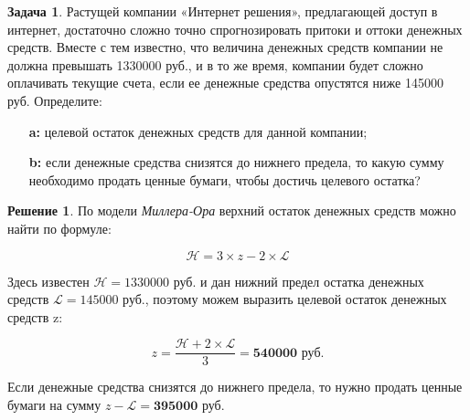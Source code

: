 \documentclass[a4paper, 14pt]{article}
\theoremstyle{plain} %
\theoremstyle{definition} %
\newtheorem*{solution}{Решение}
\newtheorem{problem}{Задача}[subsection]
\theoremstyle{remark} %
\begin{document}
\begin{problem}
	Растущей компании «Интернет решения», предлагающей доступ в интернет, достаточно сложно точно спрогнозировать притоки и оттоки денежных средств. Вместе с тем известно, что  величина денежных средств компании не должна превышать 1330000 руб., и в то же время, компании будет сложно оплачивать текущие счета, если ее денежные средства опустятся ниже 145000 руб. Определите:
	\begin{itemize}
		\item[\textbf{a:}] целевой  остаток  денежных  средств  для  данной компании;
		\item[\textbf{b:}] если  денежные  средства  снизятся  до  нижнего предела,  то  какую  сумму  необходимо  продать  ценные  бумаги,  чтобы  достичь целевого остатка?
	\end{itemize}
	\begin{solution}
		По  модели  \emph{Миллера-Ора}  верхний остаток денежных средств можно найти по формуле:

		\[
			\mathcal{H} = 3\times z - 2 \times \mathcal{L}
		\]

		Здесь  известен  $\mathcal{H} = 1330000$  руб.  и  дан  нижний  предел  остатка  денежных средств  $\mathcal{L} = 145000$  руб.,  поэтому  можем  выразить  целевой  остаток  денежных средств z:

		\[
			z = \frac{\mathcal{H} + 2\times \mathcal{L}}{3} = \textbf{540000 руб.}
		\]

		Если денежные средства снизятся до нижнего предела, то нужно продать ценные  бумаги  на  сумму $z - \mathcal{L} = \textbf{395000 руб.}$
	\end{solution}
\end{problem}
\end{document}
